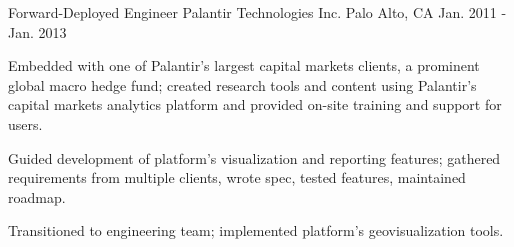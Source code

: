 \begin{cventries}
  \cventry
    {Forward-Deployed Engineer} %
    {Palantir Technologies Inc.} %
    {Palo Alto, CA} %
    {Jan. 2011 - Jan. 2013} %
    {
      \begin{cvitems} %
        \item {Embedded with one of Palantir's largest capital markets clients, a prominent global macro hedge fund; created research tools and content using Palantir's capital markets analytics platform and provided on-site training and support for users.}
        \item {Guided development of platform's visualization and reporting features; gathered requirements from multiple clients, wrote spec, tested features, maintained roadmap.}
        \item {Transitioned to engineering team; implemented platform's geovisualization tools.}
      \end{cvitems}
    }

\end{cventries}
